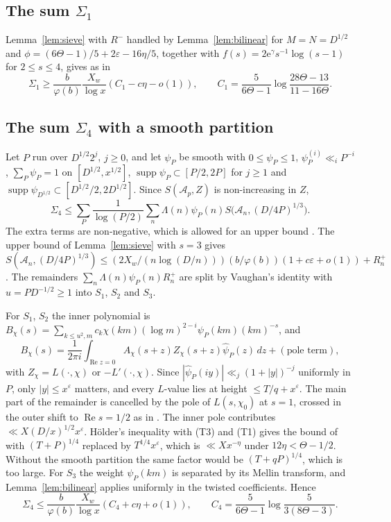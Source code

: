 \documentclass[11pt]{amsart}
\theoremstyle{definition}
\numberwithin{equation}{section}
\newcommand{\e}{\mathrm{e}}
\newcommand{\cA}{\mathcal{A}}
\begin{document}
\subsection{The sum $\Sigma_1$}
Lemma~\ref{lem:sieve} with $R^-$ handled by Lemma~\ref{lem:bilinear} for $M=N=D^{1/2}$ and $\phi=(6\Theta-1)/5+2\varepsilon-16\eta/5$, together with $f(s)=2\e^\gamma s^{-1}\log(s-1)$ for $2\le s\le4$, gives as in \cite[pp.~57--59]{HBI}
\[
\Sigma_1\ge\frac{b}{\varphi(b)}\frac{X_w}{\log x}(C_1-c\eta-o(1)),\qquad C_1=\frac5{6\Theta-1}\log\frac{28\Theta-13}{11-16\Theta}.
\]

\subsection{The sum $\Sigma_4$ with a smooth partition}
Let $P$ run over $D^{1/2}2^j$, $j\ge0$, and let $\psi_P$ be smooth with $0\le\psi_P\le1$, $\psi_P^{(i)}\ll_iP^{-i}$, $\sum_P\psi_P=1$ on $[D^{1/2},x^{1/2}]$, $\operatorname{supp}\psi_P\subset[P/2,2P]$ for $j\ge1$ and $\operatorname{supp}\psi_{D^{1/2}}\subset[D^{1/2}/2,2D^{1/2}]$. Since $S(\cA_p,Z)$ is non-increasing in $Z$,
\[
\Sigma_4\le\sum_P\frac1{\log(P/2)}\sum_n\Lambda(n)\psi_P(n)S\bigl(\cA_n,(D/4P)^{1/3}\bigr).
\]
The extra terms are non-negative, which is allowed for an upper bound \cite[p.~59]{HBI}. The upper bound of Lemma~\ref{lem:sieve} with $s=3$ gives $S(\cA_n,(D/4P)^{1/3})\le(2X_w/(n\log(D/n)))(b/\varphi(b))(1+c\varepsilon+o(1))+R_n^+$. The remainders $\sum_n\Lambda(n)\psi_P(n)R_n^+$ are split by Vaughan's identity with $u=PD^{-1/2}\ge1$ into $S_1$, $S_2$ and $S_3$.

For $S_1$, $S_2$ the inner polynomial is $B_\chi(s)=\sum_{k\le u^2,m}c_k\chi(km)(\log m)^{2-i}\psi_P(km)(km)^{-s}$, and
\[
B_\chi(s)=\frac1{2\pi i}\int_{\operatorname{Re}z=0}A_\chi(s+z)Z_\chi(s+z)\hat\psi_P(z)\,dz+(\text{pole term}),
\]
with $Z_\chi=L(\cdot,\chi)$ or $-L'(\cdot,\chi)$. Since $|\hat\psi_P(iy)|\ll_j(1+|y|)^{-j}$ uniformly in $P$, only $|y|\le x^\varepsilon$ matters, and every $L$-value lies at height $\le T/q+x^\varepsilon$. The main part of the remainder is cancelled by the pole of $L(s,\chi_0)$ at $s=1$, crossed in the outer shift to $\operatorname{Re}s=1/2$ as in \cite[p.~60]{HBI}. The inner pole contributes $\ll X(D/x)^{1/2}x^\varepsilon$. Hölder's inequality with (T3) and (T1) gives the bound of \cite[p.~61]{HBI} with $(T+P)^{1/4}$ replaced by $T^{1/4}x^\varepsilon$, which is $\ll Xx^{-\eta}$ under $12\eta<\Theta-1/2$. Without the smooth partition the same factor would be $(T+qP)^{1/4}$, which is too large. For $S_3$ the weight $\psi_P(km)$ is separated by its Mellin transform, and Lemma~\ref{lem:bilinear} applies uniformly in the twisted coefficients. Hence
\[
\Sigma_4\le\frac{b}{\varphi(b)}\frac{X_w}{\log x}(C_4+c\eta+o(1)),\qquad C_4=\frac5{6\Theta-1}\log\frac5{3(8\Theta-3)}.
\]
\end{document}
